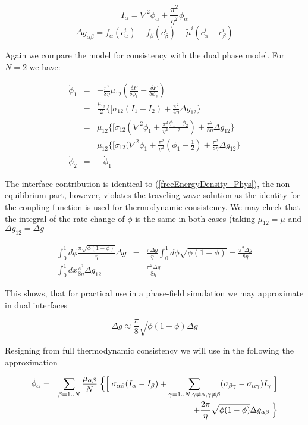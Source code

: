 \begin{equation}
  \label{Kruemmung}
I_{\alpha} = \nabla^2 \phi_\alpha + \frac{\pi^2}{\eta^2}\phi_\alpha
\end{equation}
\begin{equation}
  \label{dgab}
\Delta g_{\alpha\beta} = f_\alpha(c^i_\alpha) - f_\beta(c^i_\beta) - \tilde\mu^i (c_\alpha^i - c_\beta^i)
\end{equation}

Again we compare the model for consistency with the dual phase model. For $N=2$ we have:

\begin{eqnarray}
  \label{phiPunkt_dualPhase}
\nonumber \dot{\phi}_1 &=& - \frac{\pi^2}{8\eta} \mu_{12}(\frac{\delta F}{\delta\phi_1}-\frac{\delta F}{\delta\phi_2}) \\
\nonumber &=& \frac{\mu_{12}}  2\{[ \sigma_{12}(I_1 - I_2)  + \frac{\pi^2}{4\eta} \Delta g_{12} \} \\ \nonumber &=& \mu_{12}  \{[ \sigma_{12}(\nabla^2 \phi_1 + \frac{\pi^2}{\eta^2}\frac{\phi_1-\phi_2}2)  + \frac{\pi^2}{8\eta} \Delta g_{12} \} \\
&=& \mu_{12}  \{[ \sigma_{12}(\nabla^2 \phi_1 + \frac{\pi^2}{\eta^2}(\phi_1-\frac12)  + \frac{\pi^2}{8\eta} \Delta g_{12} \}\\
\dot{\phi}_2 &=& - \dot{\phi}_1
\end{eqnarray}

The interface contribution is identical to (\ref{freeEnergyDensity_Phys}), the non equilibrium part, however, violates the traveling wave solution as the identity for the coupling function is used for thermodynamic consistency. We may check that the integral of the rate change of $\phi$ is the same in both cases (taking $\mu_{12} = \mu$ and $\Delta g_{12} = \Delta g$

\begin{eqnarray}
  \label{velocityCheck}
 \int_0^1 d\phi  \frac{\pi\sqrt{\phi(1-\phi)}}{\eta} \Delta g &=& \frac{\pi\Delta g}{\eta}\int_0^1 d\phi  \sqrt{\phi(1-\phi)} = \frac{\pi^2\Delta g}{8\eta}\\
 \int_0^1 dx \frac{\pi^2}{8\eta} \Delta g_{12}   &=& \frac{\pi^2\Delta g}{8\eta}
\end{eqnarray}


This shows, that for practical use in a phase-field simulation we may approximate in dual interfaces

\begin{equation}\label{dgapp}
\Delta g \approx \frac\pi8\sqrt{\phi(1-\phi)}\Delta g
\end{equation}

Resigning from full thermodynamic consistency we will use in the following the approximation


\begin{eqnarray}
 \nonumber \dot{\phi}_\alpha &=& \sum_{\beta=1..N} \frac{\mu_{\alpha \beta}}
 N \Bigm\{ \Bigm[\sigma_{\alpha\beta}(I_\alpha - I_\beta) + \sum_{\gamma=1..N, \gamma \ne \alpha, \gamma \ne \beta} (  \sigma_{\beta\gamma}-\sigma_{\alpha\gamma} ) I_{\gamma}\Bigm] \\
 &\;&\;\;\;\;\;\;\;\;\; + \frac{2\pi}{\eta} \sqrt{\phi(1-\phi)} \Delta g_{\alpha\beta}\Bigm\}
\end{eqnarray}
